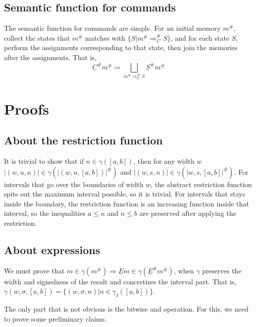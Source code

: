 \documentclass[fleqn]{article}
\theoremstyle{definition}
\begin{document}
\subsection{Semantic function for commands}
The semantic function for commands are simple. For an initial memory $m^{\#}$, collect the states that $m^{\#}$ matches with $\{S|m^{\#}\Rightarrow^{\#}_{C}S\}$, and for each state $S$, perform the assignments corresponding to that state, then join the memories after the assignments. That is,
\[
\underline{C}^{\#}m^{\#}\coloneq\bigsqcup_{m^{\#}\Rightarrow_{C}^{\#}S}\underline{S}^{\#}m^{\#}
\]

\section{Proofs}
\subsection{About the restriction function}
It is trivial to show that if $n\in\gamma([a,b])$, then for any width $w$ $|(w,u,n)|\in\gamma(|(w,u,[a,b])|^{\#})$ and $|(w,s,n)|\in\gamma(|w,s,[a,b]|^{\#})$. For intervals that go over the boundaries of width $w$, the abstract restriction function spits out the maximum interval possible, so it is trivial. For intervals that stays inside the boundary, the restriction function is an increasing function inside that interval, so the inequalities $a\le n$ and $n\le b$ are preserved after applying the restriction.

\subsection{About expressions}
We must prove that $m\in\gamma(m^{\#})\Rightarrow \underline{E}m\in\gamma(\underline{E}^{\#}m^{\#})$, when $\gamma$ preserves the width and signedness of the result and concretizes the interval part. That is, $\gamma(w,\sigma,[a,b])=\{(w,\sigma,n)|n\in\gamma_{I}([a,b])\}$.

The only part that is not obvious is the bitwise and operation. For this, we need to prove some preliminary claims.
\end{document}
